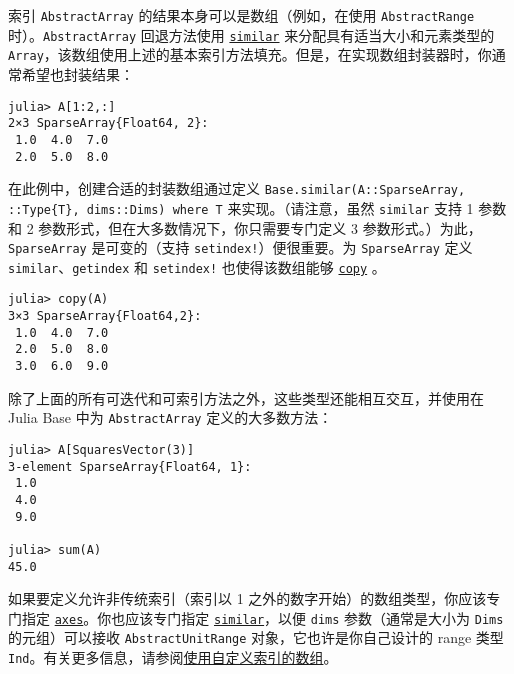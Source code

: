 索引 \texttt{AbstractArray} 的结果本身可以是数组（例如，在使用 \texttt{AbstractRange} 时）。\texttt{AbstractArray} 回退方法使用 \hyperlink{15525808546723795098}{\texttt{similar}} 来分配具有适当大小和元素类型的 \texttt{Array}，该数组使用上述的基本索引方法填充。但是，在实现数组封装器时，你通常希望也封装结果：




\begin{verbatim}
julia> A[1:2,:]
2×3 SparseArray{Float64, 2}:
 1.0  4.0  7.0
 2.0  5.0  8.0
\end{verbatim}



在此例中，创建合适的封装数组通过定义 \texttt{Base.similar(A::SparseArray, ::Type\{T\}, dims::Dims) where T} 来实现。（请注意，虽然 \texttt{similar} 支持 1 参数和 2 参数形式，但在大多数情况下，你只需要专门定义 3 参数形式。）为此，\texttt{SparseArray} 是可变的（支持 \texttt{setindex!}）便很重要。为 \texttt{SparseArray} 定义 \texttt{similar}、\texttt{getindex} 和 \texttt{setindex!} 也使得该数组能够 \hyperlink{15665284441316555522}{\texttt{copy}} 。




\begin{verbatim}
julia> copy(A)
3×3 SparseArray{Float64,2}:
 1.0  4.0  7.0
 2.0  5.0  8.0
 3.0  6.0  9.0
\end{verbatim}



除了上面的所有可迭代和可索引方法之外，这些类型还能相互交互，并使用在 Julia Base 中为 \texttt{AbstractArray} 定义的大多数方法：




\begin{verbatim}
julia> A[SquaresVector(3)]
3-element SparseArray{Float64, 1}:
 1.0
 4.0
 9.0

julia> sum(A)
45.0
\end{verbatim}



如果要定义允许非传统索引（索引以 1 之外的数字开始）的数组类型，你应该专门指定 \hyperlink{7074821531920287868}{\texttt{axes}}。你也应该专门指定 \hyperlink{15525808546723795098}{\texttt{similar}}，以便 \texttt{dims} 参数（通常是大小为 \texttt{Dims} 的元组）可以接收 \texttt{AbstractUnitRange} 对象，它也许是你自己设计的 range 类型 \texttt{Ind}。有关更多信息，请参阅\hyperlink{1238988360302116626}{使用自定义索引的数组}。



\hypertarget{2800090857858949975}{}


